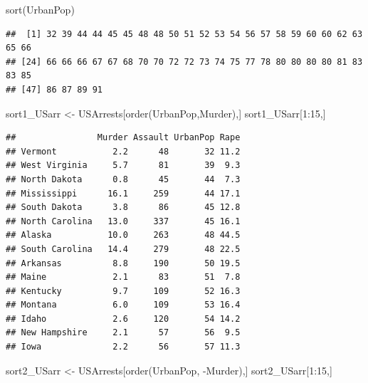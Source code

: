 \documentclass[]{article}
\newenvironment{Shaded}{\begin{snugshade}}{\end{snugshade}}
\newcommand{\DecValTok}[1]{\textcolor[rgb]{0.00,0.00,0.81}{#1}}
\newcommand{\FunctionTok}[1]{\textcolor[rgb]{0.00,0.00,0.00}{#1}}
\newcommand{\NormalTok}[1]{#1}
\newcommand{\OtherTok}[1]{\textcolor[rgb]{0.56,0.35,0.01}{#1}}
\newcommand{\SpecialCharTok}[1]{\textcolor[rgb]{0.00,0.00,0.00}{#1}}
\begin{document}
\begin{Shaded}
\begin{Highlighting}[]
\FunctionTok{sort}\NormalTok{(UrbanPop)}
\end{Highlighting}
\end{Shaded}

\begin{verbatim}
##  [1] 32 39 44 44 45 45 48 48 50 51 52 53 54 56 57 58 59 60 60 62 63 65 66
## [24] 66 66 66 67 67 68 70 70 72 72 73 74 75 77 78 80 80 80 80 81 83 83 85
## [47] 86 87 89 91
\end{verbatim}

\begin{Shaded}
\begin{Highlighting}[]
\NormalTok{sort1\_USarr }\OtherTok{\textless{}{-}}\NormalTok{ USArrests[}\FunctionTok{order}\NormalTok{(UrbanPop,Murder),]}
\NormalTok{sort1\_USarr[}\DecValTok{1}\SpecialCharTok{:}\DecValTok{15}\NormalTok{,]}
\end{Highlighting}
\end{Shaded}

\begin{verbatim}
##                Murder Assault UrbanPop Rape
## Vermont           2.2      48       32 11.2
## West Virginia     5.7      81       39  9.3
## North Dakota      0.8      45       44  7.3
## Mississippi      16.1     259       44 17.1
## South Dakota      3.8      86       45 12.8
## North Carolina   13.0     337       45 16.1
## Alaska           10.0     263       48 44.5
## South Carolina   14.4     279       48 22.5
## Arkansas          8.8     190       50 19.5
## Maine             2.1      83       51  7.8
## Kentucky          9.7     109       52 16.3
## Montana           6.0     109       53 16.4
## Idaho             2.6     120       54 14.2
## New Hampshire     2.1      57       56  9.5
## Iowa              2.2      56       57 11.3
\end{verbatim}

\begin{Shaded}
\begin{Highlighting}[]
\NormalTok{sort2\_USarr }\OtherTok{\textless{}{-}}\NormalTok{ USArrests[}\FunctionTok{order}\NormalTok{(UrbanPop, }\SpecialCharTok{{-}}\NormalTok{Murder),]}
\NormalTok{sort2\_USarr[}\DecValTok{1}\SpecialCharTok{:}\DecValTok{15}\NormalTok{,]}
\end{Highlighting}
\end{Shaded}
\end{document}
